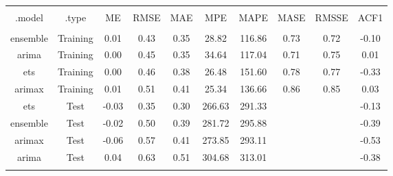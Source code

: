 
\begin{table}[!htbp] \centering 
  \caption{} 
  \label{} 
\begin{tabular}{@{\extracolsep{5pt}} cccccccccc} 
\\[-1.8ex]\hline 
\hline \\[-1.8ex] 
.model & .type & ME & RMSE & MAE & MPE & MAPE & MASE & RMSSE & ACF1 \\ 
\hline \\[-1.8ex] 
ensemble & Training &  0.01 & 0.43 & 0.35 &  28.82 & 116.86 & 0.73 & 0.72 & -0.10 \\ 
arima & Training &  0.00 & 0.45 & 0.35 &  34.64 & 117.04 & 0.71 & 0.75 &  0.01 \\ 
ets & Training &  0.00 & 0.46 & 0.38 &  26.48 & 151.60 & 0.78 & 0.77 & -0.33 \\ 
arimax & Training &  0.01 & 0.51 & 0.41 &  25.34 & 136.66 & 0.86 & 0.85 &  0.03 \\ 
ets & Test & -0.03 & 0.35 & 0.30 & 266.63 & 291.33 &  &  & -0.13 \\ 
ensemble & Test & -0.02 & 0.50 & 0.39 & 281.72 & 295.88 &  &  & -0.39 \\ 
arimax & Test & -0.06 & 0.57 & 0.41 & 273.85 & 293.11 &  &  & -0.53 \\ 
arima & Test &  0.04 & 0.63 & 0.51 & 304.68 & 313.01 &  &  & -0.38 \\ 
\hline \\[-1.8ex] 
\end{tabular} 
\end{table} 
